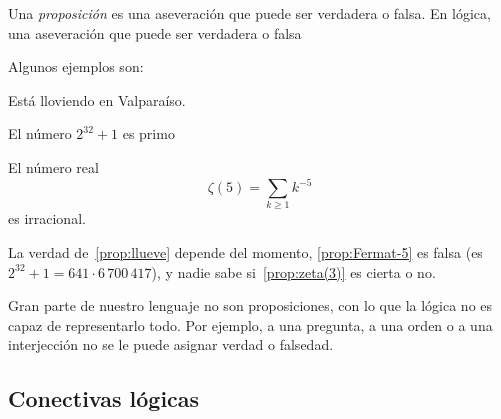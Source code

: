   \begin{definition}
    Una \emph{proposición} es una aseveración
    que puede ser verdadera o falsa.
	     {En lógica, una aseveración que puede ser verdadera o falsa}
  \end{definition}
  Algunos ejemplos son:
  \begin{proposition}
    \label{prop:llueve}
    Está lloviendo en Valparaíso.
  \end{proposition}
  \begin{proposition}
    \label{prop:Fermat-5}
    El número \(2^{32} + 1\) es primo
  \end{proposition}
  \begin{proposition}
    \label{prop:zeta(3)}
    El número real
    \begin{equation*}
      \zeta(5)
	= \sum_{k \ge 1} k^{-5}
    \end{equation*}
    es irracional.
  \end{proposition}
  La verdad de~\ref{prop:llueve} depende del momento,
  \ref{prop:Fermat-5} es falsa
  (es \(2^{32} + 1 = 641 \cdot 6\,700\,417\)),
  y nadie sabe si~\ref{prop:zeta(3)} es cierta o no.

  Gran parte de nuestro lenguaje no son proposiciones,
  con lo que la lógica no es capaz de representarlo todo.
  Por ejemplo,
  a una pregunta,
  a una orden
  o a una interjección no se le puede asignar verdad o falsedad.

\subsection{Conectivas lógicas}
\label{sec:conectivas-logicas}

